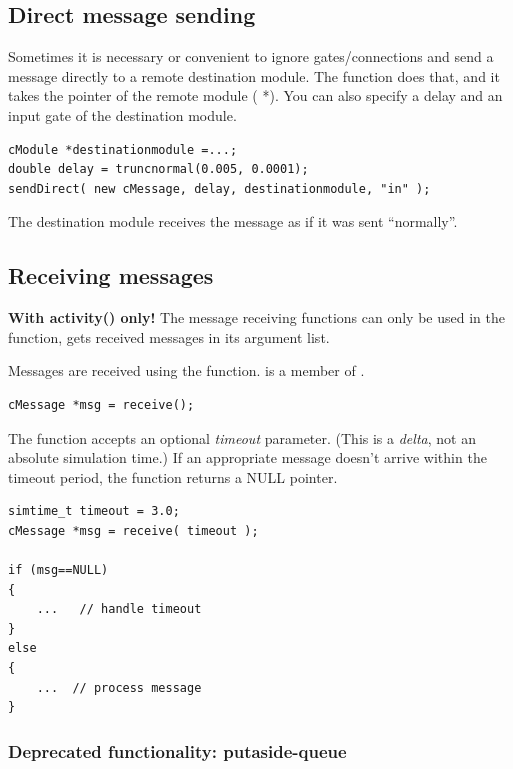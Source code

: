 \subsection{Direct message sending}

Sometimes it is necessary or convenient to ignore gates/connections
and send a message directly to a remote destination module. The 
function does that, and it takes the pointer of the remote module
( *). You can also specify a delay and an input gate of
the destination module.

\begin{verbatim}
cModule *destinationmodule =...;
double delay = truncnormal(0.005, 0.0001);
sendDirect( new cMessage, delay, destinationmodule, "in" );
\end{verbatim}

The destination module receives the message as if it was sent
``normally''.



\subsection{Receiving messages}

\textbf{With activity() only!} The message receiving functions can
only be used in the  function,
 gets received messages in its argument list.

Messages are received using the  function.
 is a member of .

\begin{verbatim}
cMessage *msg = receive();
\end{verbatim}

The  function accepts an optional \textit{timeout}
parameter. (This is a \textit{delta}, not an
absolute simulation time.) If an appropriate message doesn't arrive
within the timeout period, the function returns a NULL pointer.

\begin{verbatim}
simtime_t timeout = 3.0;
cMessage *msg = receive( timeout );

if (msg==NULL)
{
    ...   // handle timeout
}
else
{
    ...  // process message
}
\end{verbatim}


\subsubsection{Deprecated functionality: putaside-queue}
\label{ch:simple-modules:putaside-queue}

